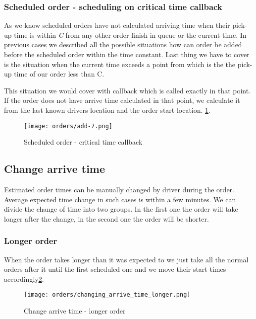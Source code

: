 	\subsubsection{Scheduled order - scheduling on critical time callback}
	As we know scheduled orders have not calculated arriving time when their pick-up time is within \textit{C} from any other order finish in queue or the current time. In previous cases we described all the possible situations how can order be added before the scheduled order within the time constant. Last thing we have to cover is the situation when the current time exceeds a point from which is the the pick-up time of our order less than C.
	
	This situation we would cover with callback which is called exactly in that point. If the order does not have arrive time calculated in that point, we calculate it from the last known drivers location and the order start location. 
	 \ref{order-process-scheduled-critical-time}.

	\begin{figure}[h]\centering
		\texttt{[image: orders/add-7.png]}
		\caption{Scheduled order - critical time callback} 
		\label{order-process-scheduled-critical-time}
	\end{figure} 

\subsection{Change arrive time}
	Estimated order times can be manually changed by driver during the order. Average expected time change in such cases is within a few minutes. We can divide the change of time into two groups. In the first one the order will take longer after the change, in the second one the order will be shorter.
	
	\subsubsection{Longer order}
	When the order takes longer than it was expected to we just take all the normal orders after it until the first scheduled one and we move their start times accordingly\ref{order-process-change_longer}.
	\begin{figure}[h]\centering
		\texttt{[image: orders/changing\_arrive\_time\_longer.png]}
		\caption{Change arrive time - longer order} 
		\label{order-process-change_longer}
	\end{figure} 


